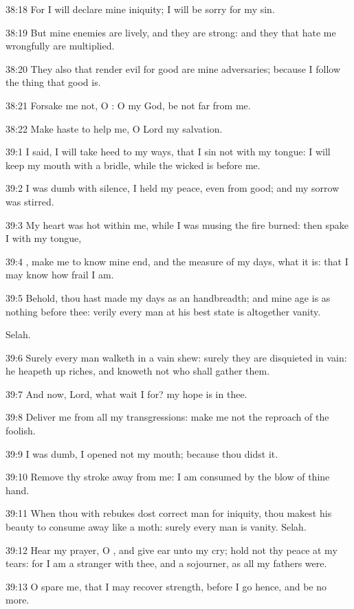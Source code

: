 38:18 For I will declare mine iniquity; I will be sorry for my sin.

38:19 But mine enemies are lively, and they are strong: and they that
hate me wrongfully are multiplied.

38:20 They also that render evil for good are mine adversaries;
because I follow the thing that good is.

38:21 Forsake me not, O \LORD: O my God, be not far from me.

38:22 Make haste to help me, O Lord my salvation.



39:1 I said, I will take heed to my ways, that I sin not with my
tongue: I will keep my mouth with a bridle, while the wicked is before
me.

39:2 I was dumb with silence, I held my peace, even from good; and my
sorrow was stirred.

39:3 My heart was hot within me, while I was musing the fire burned:
then spake I with my tongue,

39:4 \LORD, make me to know mine end, and the measure of my days, what
it is: that I may know how frail I am.

39:5 Behold, thou hast made my days as an handbreadth; and mine age is
as nothing before thee: verily every man at his best state is
altogether vanity.

Selah.

39:6 Surely every man walketh in a vain shew: surely they are
disquieted in vain: he heapeth up riches, and knoweth not who shall
gather them.

39:7 And now, Lord, what wait I for? my hope is in thee.

39:8 Deliver me from all my transgressions: make me not the reproach
of the foolish.

39:9 I was dumb, I opened not my mouth; because thou didst it.

39:10 Remove thy stroke away from me: I am consumed by the blow of
thine hand.

39:11 When thou with rebukes dost correct man for iniquity, thou
makest his beauty to consume away like a moth: surely every man is
vanity. Selah.

39:12 Hear my prayer, O \LORD, and give ear unto my cry; hold not thy
peace at my tears: for I am a stranger with thee, and a sojourner, as
all my fathers were.

39:13 O spare me, that I may recover strength, before I go hence, and
be no more.



